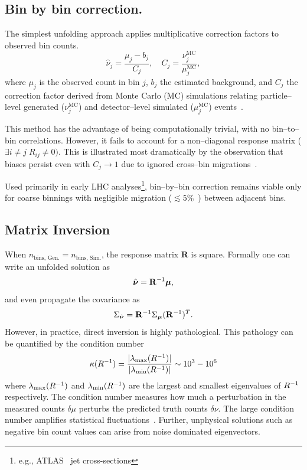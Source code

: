 \subsection{Bin by bin correction.}  
The simplest unfolding approach applies multiplicative correction factors to observed bin counts.
\begin{equation}
    \hat{\nu}_j = \frac{\mu_j - b_j}{C_j}, \quad C_j = \frac{\nu^{\text{MC}}_j}{\mu^{\text{MC}}_j},
\end{equation}  
where \(\mu_j\) is the observed count in bin \(j\), \(b_j\) the estimated background, and \(C_j\) the correction factor derived from Monte Carlo (MC) simulations relating particle--level generated (\(\nu^{\text{MC}}_j\)) and detector--level simulated (\(\mu^{\mathrm{MC}}_j\)) events~\cite{cowan_statistics_2021}. 

This method has the advantage of being computationally trivial, with no bin--to--bin correlations.
%
However, it fails to account for a non--diagonal response matrix (\(\exists i \neq j\;R_{ij} \ne 0)\).
%
This is illustrated most dramatically by the observation that biases persist even with \(C_j \rightarrow 1\) due to ignored cross--bin migrations~\cite{cowan_topics_2010}.

Used primarily in early LHC analyses\footnote{e.g., ATLAS~\cite{aad_measurement_2011, noauthor_implications_nodate} jet cross-sections}, bin--by--bin correction remains viable only for coarse binnings with negligible migration (\(\lesssim 5\%\)~\cite{cms_collaboration_measurement_2011}) between adjacent bins.

\subsection{Matrix Inversion}  
When \(n_{\text{bins, Gen.}} = n_{\text{bins, Sim.}}\), the response matrix $\mathbf{R}$ is square.
%
Formally one can write an unfolded solution as  
\begin{equation}
    \hat{\boldsymbol{\nu}} = \mathbf{R}^{-1}\vb*{\mu},
\end{equation}  
and even propagate the covariance as  
\begin{equation}
    \Sigma_{\hat{\boldsymbol{\nu}}} = \mathbf{R}^{-1}\Sigma_{\vb*{\mu}} (\mathbf{R}^{-1})^T.
\end{equation}  
However, in practice, direct inversion is highly pathological.
%
This pathology can be quantified by the condition number
\begin{equation}
    \kappa(R^{-1}) = \frac{|\lambda_{\mathrm{max}}(R^{-1})|}{|\lambda_{\mathrm{min}}(R^{-1})|} \sim 10^3 - 10^6
\end{equation}
where $\lambda_{\mathrm{max}}(R^{-1})$ and $\lambda_{\mathrm{min}}(R^{-1})$ are the largest and smallest eigenvalues of $R^{-1}$ respectively.
%
The condition number measures how much a perturbation in the measured counts $\delta\mu$ perturbs the predicted truth counts $\delta\nu$.
%
The large condition number amplifies statistical fluctuations~\cite{belsley_regression_2005, pesaran_time_2015}.
%
Further, unphysical solutions such as negative bin count values can arise from noise dominated eigenvectors.

